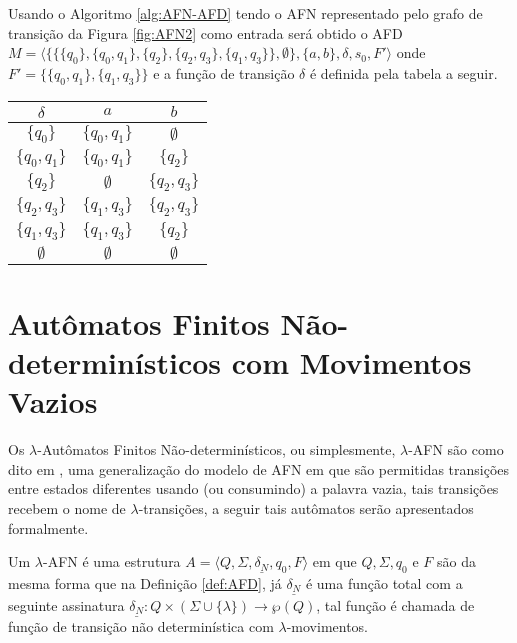\begin{example}\label{exe:ConvertendoAFN-AFD2}
	Usando o Algoritmo \ref{alg:AFN-AFD}  tendo o AFN representado pelo grafo de transição da Figura \ref{fig:AFN2} como entrada será obtido o AFD $M = \langle \{ \{\{q_0\}, \{q_0, q_1\}, \{q_2\}, \{q_2, q_3\},  \{q_1, q_3\} \}, \emptyset\}, \{a,b\}, \delta, s_0, F'\rangle$ onde  $F' = \{\{q_0, q_1\}, \{q_1, q_3\}\}$ e a função de transição $\delta$ é definida pela tabela a seguir. 
	
	\begin{table*}[h]
		\centering
		\begin{tabular}{c|cc}
			$\delta$	& $a$ & $b$\\ \hline
			$\{q_0\}$		& $\{q_0, q_1\}$ & $\emptyset$ \\
			$\{q_0, q_1\}$		& $\{q_0, q_1\}$  & $\{q_2\}$ \\
			$\{q_2\}$		& $\emptyset$  & $\{q_2, q_3\}$ \\
			$\{q_2, q_3\}$		& $\{q_1, q_3\}$ & $\{q_2, q_3\}$ \\
			$\{q_1, q_3\}$		& $\{q_1, q_3\}$& $\{q_2\}$ \\
			$\emptyset$		& $\emptyset$ & $\emptyset$ \\ \hline
		\end{tabular}
	\end{table*}
\end{example}

\section{Autômatos Finitos Não-determinísticos com Movimentos Vazios}\label{sec:LAFN}

Os $\lambda$-Autômatos Finitos Não-determinísticos, ou simplesmente, $\lambda$-AFN são como dito em \cite{menezes1998LFA}, uma generalização do modelo de AFN em que são permitidas transições entre estados diferentes usando (ou consumindo) a palavra vazia, tais transições recebem o nome de $\lambda$-transições, a seguir tais autômatos serão apresentados formalmente.

\begin{definition}\label{def:LAFN}
	Um $\lambda$-AFN é uma estrutura $A = \langle Q, \Sigma, \underline{\delta_N}, q_0, F\rangle$ em que $Q, \Sigma, q_0$ e $F$ são da mesma forma que na Definição \ref{def:AFD}, já $\underline{\delta_N}$ é uma função total com a seguinte assinatura $\underline{\delta_N} : Q \times (\Sigma \cup \{\lambda\}) \rightarrow \wp(Q)$, tal função é chamada de função de transição não determinística com $\lambda$-movimentos.
\end{definition}

